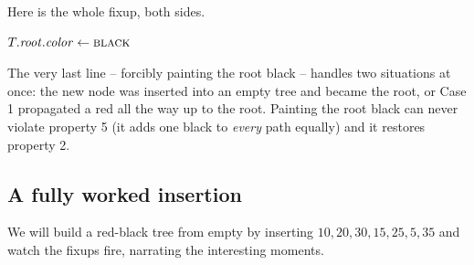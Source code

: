 Here is the whole fixup, both sides.

\begin{algorithm}[H]
\caption{\textsc{RB-Insert-Fixup}$(T, z)$}
$T.\mathit{root}.\mathit{color} \gets \textsc{black}$\;
\end{algorithm}

\begin{focusbox}
The very last line -- forcibly painting the root black -- handles two
situations at once: the new node was inserted into an empty tree and became the
root, or Case 1 propagated a red all the way up to the root. Painting the root
black can never violate property 5 (it adds one black to \emph{every} path
equally) and it restores property 2.
\end{focusbox}

\subsection{A fully worked insertion}\label{ch13:sec-worked-insert}

We will build a red-black tree from empty by inserting $10, 20, 30, 15, 25, 5, 35$
and watch the fixups fire, narrating the interesting moments.

